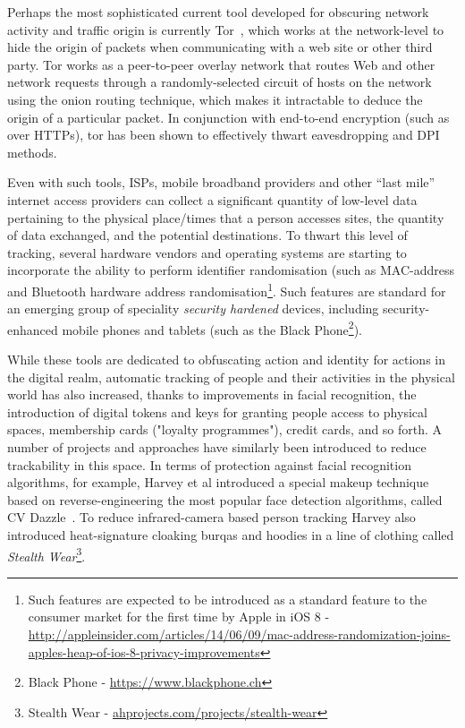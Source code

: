 \documentclass{IOS-Book-Article}     %
\begin{document}
Perhaps the most sophisticated current tool developed for obscuring network activity and traffic origin is currently Tor~\cite{dingledine2004tor}, which works at the network-level to hide the origin of packets when communicating with a web site or other third party.  Tor works as a peer-to-peer overlay network that routes Web and other network requests through a randomly-selected circuit of hosts on the network using the onion routing technique, which makes it intractable to deduce the origin of a particular packet.  In conjunction with end-to-end encryption (such as over HTTPs), tor has been shown to effectively thwart eavesdropping and DPI methods.

Even with such tools, ISPs, mobile broadband providers and other ``last mile'' internet access providers can collect a significant quantity of low-level data pertaining to the physical place/times that a person accesses sites, the quantity of data exchanged, and the potential destinations.  To thwart this level of tracking, several hardware vendors and operating systems are starting to incorporate the ability to perform identifier randomisation (such as MAC-address and Bluetooth hardware address randomisation\footnote{Such features are expected to be introduced as a standard feature to the consumer market for the first time by Apple in iOS 8 - \url{http://appleinsider.com/articles/14/06/09/mac-address-randomization-joins-apples-heap-of-ios-8-privacy-improvements}}.  Such features are standard for an emerging group of speciality \emph{security hardened} devices, including security-enhanced mobile phones and tablets (such as the Black Phone\footnote{Black Phone - \url{https://www.blackphone.ch}}). 

While these tools are dedicated to obfuscating action and identity for actions in the digital realm, automatic tracking of people and their activities in the physical world has also increased, thanks to improvements in facial recognition, the introduction of digital tokens and keys for granting people access to physical spaces, membership cards ("loyalty programmes"), credit cards, and so forth.  A number of projects and approaches have similarly been introduced to reduce trackability in this space.  In terms of protection against facial recognition algorithms, for example, Harvey et al introduced a special makeup technique based on reverse-engineering the most popular face detection algorithms, called CV Dazzle~\cite{harvey2012cv}. To reduce infrared-camera based person tracking Harvey also introduced heat-signature cloaking burqas and hoodies in a line of clothing called \emph{Stealth Wear}\footnote{Stealth Wear - \url{ahprojects.com/projects/stealth-wear}}.
\end{document}
